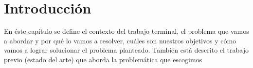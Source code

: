 \chapter{Introducci\'on}

En éste capítulo se define el contexto del trabajo terminal, el problema que vamos a abordar y por qué lo vamos a resolver, cuáles son nuestros objetivos y cómo vamos a lograr solucionar el problema planteado. También está descrito el trabajo previo (estado del arte) que aborda la problemática que escogimos